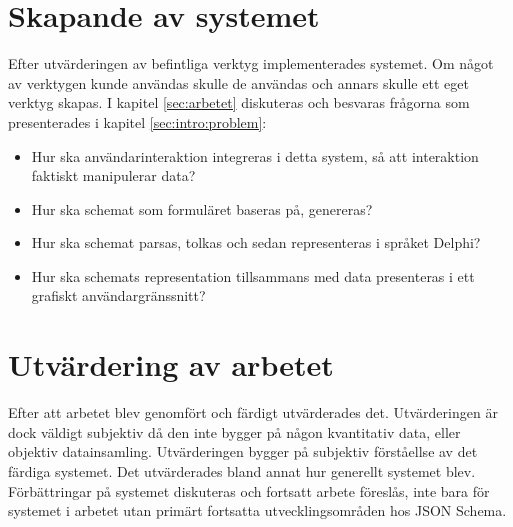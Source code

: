 \section{Skapande av systemet}
\label{sec:metod:praktiska-frågor}
Efter utvärderingen av befintliga verktyg implementerades systemet. Om något av verktygen kunde användas skulle de användas och annars skulle ett eget verktyg skapas. I kapitel \ref{sec:arbetet} diskuteras och besvaras frågorna som presenterades i kapitel \ref{sec:intro:problem}:

\begin{itemize}
	\item Hur ska användarinteraktion integreras i detta system, så att interaktion faktiskt manipulerar data?
	\item Hur ska schemat som formuläret baseras på, genereras?
	\item Hur ska schemat parsas, tolkas och sedan representeras i språket Delphi?
	\item Hur ska schemats representation tillsammans med data presenteras i ett grafiskt användargränssnitt?
\end{itemize}

\section{Utvärdering av arbetet}
\label{sec:metod:utvärdering-arbetet}
Efter att arbetet blev genomfört och färdigt utvärderades det. Utvärderingen är dock väldigt subjektiv då den inte bygger på någon kvantitativ data, eller objektiv datainsamling. Utvärderingen bygger på subjektiv förståellse av det färdiga systemet. Det utvärderades bland annat hur generellt systemet blev. Förbättringar på systemet diskuteras och fortsatt arbete föreslås, inte bara för systemet i arbetet utan primärt fortsatta utvecklingsområden hos JSON Schema.